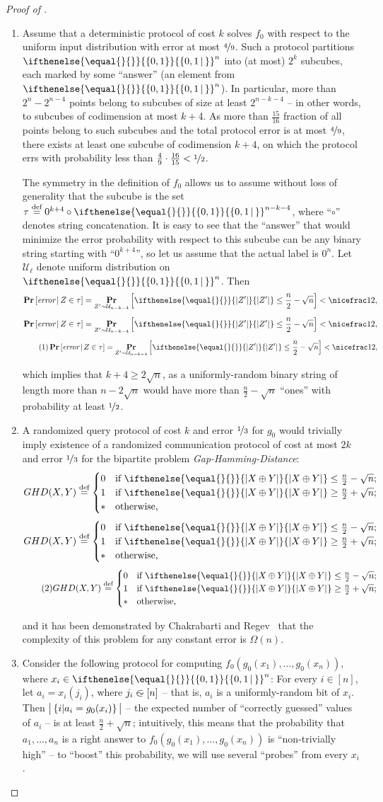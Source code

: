 \documentclass{toc}
\newcommand{\md}{\middle}
\newcommand{\malabel}[1]{\addtocounter{equation}{1}\tag{\theequation}\label{#1}}
\newcommand{\m}[2][]{%
\ifthenelse{\equal{}{#1}}%
{\begin{align*} #2 \end{align*}}%
{\ifthenelse{\eq<ual{P}{#1}}%
{\begingroup\allowdisplaybreaks\begin{align*} #2%
\end{align*}\endgroup}%
{\begin{align*} \malabel{#1} #2 \end{align*}}%
}%
}
\newcommand{\thrcase}[6]%
{\begin{cases} #1 &\txt{#2}\\ #3 &\txt{#4}\\ #5 &\txt{#6}\end{cases}}
\newcommand{\PRdg}[2][]{\mathop{\mathbf{Pr}}_{#1}\left[{#2}\right]}
\newcommand{\PRr}[3][]{\mathop{\mathbf{Pr}}_{#1}\left[{#2}\,\md|\,{#3}\right]}
\newcommand{\dr}{\nicefrac}
\newcommand{\sq}{\sqrt}
\newcommand{\set}[2][]{\ifthenelse{\equal{}{#1}}%
{\ensuremath{\left\{#2\right\}}}%
{\ensuremath{\left\{#2\,\md|\,#1\right\}}}}
\newcommand{\asOm}[1]{\Omega(#1)}
\newcommand{\OI}{\set{0,1}}
\newcommand{\sz}[2][]{\ifthenelse{\equal{}{#1}}%
{\ensuremath{\left|#2\right|}}%
{\ensuremath{\left|#2\right|_{#1}}}}
\newcommand{\sszz}[2]{\left|\vphantom{|_1^1}\left\{#1\md|#2\right\}\vphantom{|_1^1}\right|}
\newcommand{\txt}[1]{\textrm{#1}}  %
\newcommand{\tit}[1]{\textit{#1}}  %
\newcommand{\xor}{\oplus}
\newcommand{\deq}{\stackrel{\textrm{def}}{=}}
\newcommand{\unin}{\mathrel{\subset\mkern-13.1mu\sim}}  %
\newcommand{\dc}{,\dots,}
\newcommand{\e}{\emph}
\begin{document}
\begin{proof}[Proof of {}]
\begin{enumerate}
\item[(i)] Assume that a deterministic protocol of cost $k$ solves $f_0$ with respect to the uniform input distribution with error at most $\dr49$.
Such a protocol partitions $\OI^n$ into (at most)
%
$2^k$ subcubes, each marked by some ``answer'' (an element from $\OI^n$).
In particular, more than $2^n-2^{n-4}$ points belong to subcubes of size at least $2^{n-k-4}$ -- in other words, to subcubes of codimension at most $k+4$.
As more than $\frac{15}{16}$ fraction of all points belong to such subcubes and the total protocol error is at most $\dr49$, there exists at least one subcube of codimension $k+4$, on which the protocol errs with probability less than $\frac{4}{9} \cdot \frac{16}{15} < \dr12$.

The symmetry in the definition of $f_0$ allows us to assume without loss of generality that the subcube is the set $\tau\deq0^{k+4}\circ\OI^{n-k-4}$, where ``$\circ$'' denotes string concatenation.
It is easy to see that the ``answer'' that would minimize the error probability with respect to this subcube can be any binary string starting with ``$0^{k+4}$'', so let us assume that the actual label is $0^n$. Let $\mathcal{U}_{\ell}$ denote uniform distribution on $\OI^n$.
Then
\m{
  \PRr{\tit{error}}{Z\in\tau}
  =\PRdg[Z'\sim\mathcal{U}_{n-k-4}]{\sz{Z'}\le\frac n2-\sq n}
  <\dr12
,}
which implies that $k+4\ge2\sq n$, as a uniformly-random binary string of length more than $n-2\sq n$ would have more than $\frac n2-\sq n$ ``ones'' with probability at least $\dr12$.

\item[(ii)] A randomized query protocol of cost $k$ and error $\dr13$ for $g_0$ would trivially imply existence of a randomized communication protocol of cost at most $2k$ and error $\dr13$ for the bipartite problem \e{Gap-Hamming-Distance}:
\m{
  GHD(X,Y)\deq\thrcase
    {0}{if $\sz{X\xor Y}\le\frac n2-\sq n$;}
    {1}{if $\sz{X\xor Y}\ge\frac n2+\sq n$;}
    {*}{otherwise,}
}
and it has been demonstrated by Chakrabarti and Regev~\cite{CR11_An_O} that the complexity of this problem for any constant error is $\asOm n$.

\item[(iii)] Consider the following protocol for computing $f_0\left(g_0(x_1)\dc g_0(x_n)\right)$, where $x_i\in\OI^n$:
For every $i\in[n]$, let $a_i=x_i(j_i)$, where $j_i\unin[n]$ -- that is, $a_i$ is a uniformly-random bit of $x_i$.
Then $\sszz{i}{a_i=g_0(x_i)}$ -- the expected number of ``correctly guessed'' values of $a_i$ -- is at least $\frac n2+\sq n$; intuitively, this means that the probability that $a_1\dc a_n$ is a right answer to $f_0\left(g_0(x_1)\dc g_0(x_n)\right)$ is ``non-trivially high'' -- to ``boost'' this probability, we will use several ``probes'' from every $x_i$.


\end{enumerate}
\end{proof}
\end{document}
